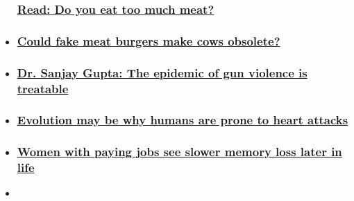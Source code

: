 \begin{itemize}
{  \subsubsection{\texorpdfstring{\href{/interactive/2019/09/health/parallels/meat-vital-signs-wellness/}{Read:
  Do you eat too much
  meat?}}{Read: Do you eat too much meat?}}\label{read-do-you-eat-too-much-meat}}
\item
  \hypertarget{could-fake-meat-burgers-make-cows-obsolete-}{%
  \subsubsection{\texorpdfstring{\href{/2019/08/22/health/future-of-meat-vital-signs/index.html}{Could
  fake meat burgers make cows obsolete?
  }}{Could fake meat burgers make cows obsolete? }}\label{could-fake-meat-burgers-make-cows-obsolete-}}
\item
  \hypertarget{dr-sanjay-gupta-the-epidemic-of-gun-violence-is-treatable}{%
  \subsubsection{\texorpdfstring{\href{/2019/08/06/health/gupta-gun-violence-prevention/index.html}{Dr.
  Sanjay Gupta: The epidemic of gun violence is
  treatable}}{Dr. Sanjay Gupta: The epidemic of gun violence is treatable}}\label{dr-sanjay-gupta-the-epidemic-of-gun-violence-is-treatable}}
\item
  \hypertarget{evolution-may-be-why-humans-are-prone-to-heart-attacks}{%
  \subsubsection{\texorpdfstring{\href{/2019/07/22/health/heart-attacks-human-evolution-scn/index.html}{Evolution
  may be why humans are prone to heart
  attacks}}{Evolution may be why humans are prone to heart attacks}}\label{evolution-may-be-why-humans-are-prone-to-heart-attacks}}
\item
  \hypertarget{women-with-paying-jobs-see-slower-memory-loss-later-in-life}{%
  \subsubsection{\texorpdfstring{\href{/2019/07/16/health/women-jobs-memory-loss-study-trnd/index.html}{Women
  with paying jobs see slower memory loss later in
  life}}{Women with paying jobs see slower memory loss later in life}}\label{women-with-paying-jobs-see-slower-memory-loss-later-in-life}}
\item
  \hypertarget{scientists-have-found-that-anorexia-is-linked-to-metabolism}{%
}
\end{itemize}
